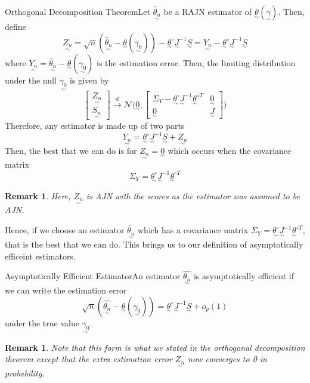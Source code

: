 \documentclass[twoside]{article}
\newtheorem{remark}[theorem]{Remark}
\newcommand{\utilde}{\underset{\sim}}
\begin{document}
\begin{proposition_exam}{Orthogonal Decomposition Theorem}{}Let $\tilde{\utilde{\theta_n}}$ be a RAJN estimator of $\utilde{\theta}(\utilde{\gamma}).$ Then, define 
$$
\utilde{Z_n} = \sqrt{n}(\tilde{\utilde{\theta_n}} - \utilde{\theta}(\utilde{\gamma_0})) - \utilde{\theta}^{\circ}\utilde{J}^{-1}\utilde{S} = \utilde{Y_n} - \utilde{\theta}^{\circ}\utilde{J}^{-1}\utilde{S}
$$
where $\utilde{Y_n} = \tilde{\utilde{\theta_n}} - \utilde{\theta}(\utilde{\gamma_0})$ is the estimation error. 
Then, the limiting distribution under the null $\utilde{\gamma_0}$ is given by
$$
\begin{bmatrix}
\utilde{Z_n}\\
\utilde{S_n}
\end{bmatrix}
\xrightarrow{d}
\mathcal{N}
\bigg( 
\utilde{0},
\begin{bmatrix}
\Sigma_Y - \utilde{\theta^{\circ}}\utilde{J}^{-1}\utilde{\theta}^{\circ T} & \utilde{0}\\
\utilde{0} & \utilde{J}
\end{bmatrix}
\bigg)
$$
Therefore, any estimator is made up of two parts 
$$
\utilde{Y_n}  = \utilde{\theta}^{\circ}\utilde{J}^{-1}\utilde{S} + \utilde{Z_n}
$$
Then, the best that we can do is for $\utilde{Z_n} = \utilde{0}$ which occurs when the covariance matrix 
$$
\Sigma_Y = \utilde{\theta^{\circ}}\utilde{J}^{-1}\utilde{\theta}^{\circ T}
$$
\end{proposition_exam}

\begin{remark}Here, $\utilde{Z_n}$ is AJN with the scores as the estimator was assumed to be AJN.
\end{remark}

Hence, if we choose an estimator $\tilde{\utilde{\theta_n}}$ which has a covariance matrix $\Sigma_Y = \utilde{\theta^{\circ}}\utilde{J}^{-1}\utilde{\theta}^{\circ T}$, that is the best that we can do. This brings us to our definition of asymptotically efficeint estimators.

\begin{definition_exam}{Asymptotically Efficient Estimator}{}An estimator $\hat{\utilde{\theta_n}}$ is asymptotically efficient if we can write the estimation error 
$$
\sqrt{n}(\hat{\utilde{\theta_n}} - \utilde{\theta}(\utilde{\gamma_0})) = \utilde{\theta}^{\circ}\utilde{J}^{-1}\utilde{S} + o_p(1)
$$
under the true value $\utilde{\gamma_0}$.
\end{definition_exam}

\begin{remark}Note that this form is what we stated in the orthogonal decomposition theorem except that the extra estimation error $\utilde{Z_n}$ now converges to 0 in probability.
\end{remark}
\end{document}
